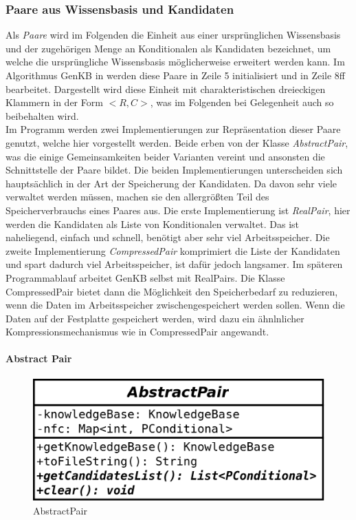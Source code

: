 \documentclass[12pt,a4paper]{article}
\begin{document}
\subsubsection{Paare aus Wissensbasis und Kandidaten}
Als \textit{Paare} wird im Folgenden die Einheit aus einer ursprünglichen Wissensbasis und der zugehörigen Menge an Konditionalen als Kandidaten bezeichnet, um welche die ursprüngliche Wissensbasis möglicherweise erweitert werden kann. Im Algorithmus GenKB in \cite{beierle19} werden diese Paare in Zeile 5 initialisiert und in Zeile 8ff bearbeitet. Dargestellt wird diese Einheit mit charakteristischen dreieckigen Klammern in der Form $<R, C>$, was im Folgenden bei Gelegenheit auch so beibehalten wird. \\
Im Programm werden zwei Implementierungen zur Repräsentation dieser Paare genutzt, welche hier vorgestellt werden. Beide erben von  der Klasse \textit{AbstractPair}, was die einige Gemeinsamkeiten beider Varianten vereint und ansonsten die Schnittstelle der Paare bildet. Die beiden Implementierungen unterscheiden sich hauptsächlich in der Art der Speicherung der Kandidaten. Da davon sehr viele verwaltet werden müssen, machen sie den allergrößten Teil des Speicherverbrauchs eines Paares aus. Die erste Implementierung ist \textit{RealPair}, hier werden die Kandidaten als Liste von Konditionalen verwaltet. Das ist naheliegend, einfach und schnell, benötigt aber sehr viel Arbeitsspeicher. Die zweite Implementierung \textit{CompressedPair} komprimiert die Liste der Kandidaten und spart dadurch viel Arbeitsspeicher, ist dafür jedoch langsamer. Im späteren Programmablauf arbeitet GenKB selbst mit RealPairs. Die Klasse CompressedPair bietet dann die Möglichkeit den Speicherbedarf zu reduzieren, wenn die Daten im Arbeitsspeicher zwischengespeichert werden sollen. Wenn die Daten auf der Festplatte gespeichert werden, wird dazu ein ähnlnlicher Kompressionsmechanismus wie in CompressedPair angewandt.




\paragraph{Abstract Pair}
\label{sec:abstractpair}

\begin{figure}
\includegraphics[width=0.45\linewidth]{bilder/AbstractPair.png}
\caption{AbstractPair}
\label{pic:abstractpair}
\end{figure}
\end{document}
